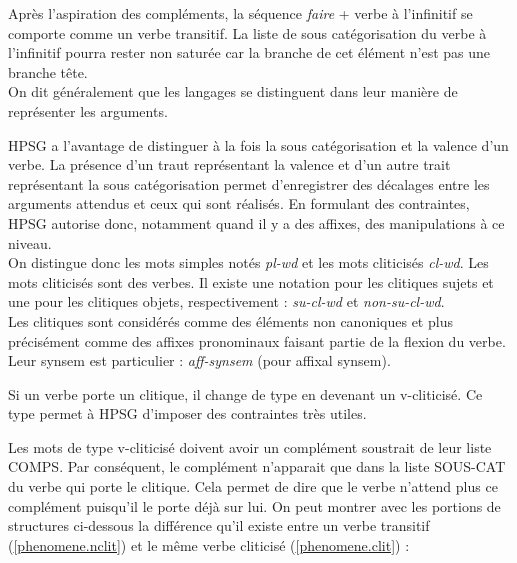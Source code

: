 Après l'aspiration des compléments, la séquence \emph{faire} + verbe à l'infinitif se comporte comme un verbe transitif.
La liste de sous catégorisation du verbe à l'infinitif pourra rester non saturée car la branche de cet élément n'est pas une branche tête.\\

On dit généralement que les langages se distinguent dans leur manière de représenter les arguments.

HPSG a l'avantage de distinguer à la fois la sous catégorisation et la valence d'un verbe.
La présence d'un traut représentant la valence et d'un autre trait représentant la sous catégorisation permet d'enregistrer des décalages entre les arguments attendus et ceux qui sont réalisés.
En formulant des contraintes, HPSG autorise donc, notamment quand il y a des affixes, des manipulations à ce niveau.\\

On distingue donc les mots simples notés \emph{pl-wd} et les mots cliticisés \emph{cl-wd}.
Les mots cliticisés sont des verbes.
Il existe une notation pour les clitiques sujets et une pour les clitiques objets, respectivement : \emph{su-cl-wd} et \emph{non-su-cl-wd}.\\

Les clitiques sont considérés comme des éléments non canoniques et plus précisément comme des affixes pronominaux faisant partie de la flexion du verbe.
Leur synsem est particulier : \emph{aff-synsem} (pour affixal synsem).

Si un verbe porte un clitique, il change de type en devenant un v-cliticisé.
Ce type permet à HPSG d'imposer des contraintes très utiles.

Les mots de type v-cliticisé doivent avoir un complément soustrait de leur liste COMPS.
Par conséquent, le complément n'apparait que dans la liste SOUS-CAT du verbe qui porte le clitique.
Cela permet de dire que le verbe n'attend plus ce complément puisqu'il le porte déjà sur lui.
On peut montrer avec les portions de structures ci-dessous la différence qu'il existe entre un verbe transitif (\autoref{phenomene.nclit}) et le même verbe cliticisé (\autoref{phenomene.clit}) :\\

